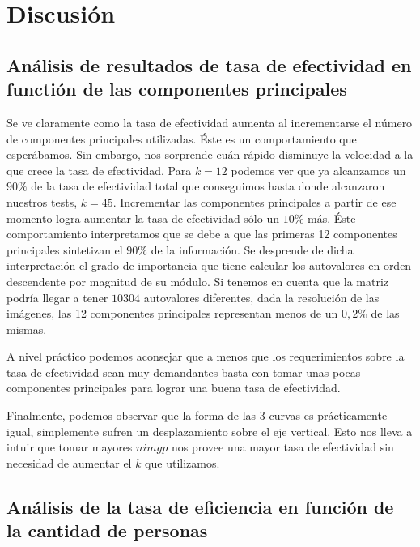 \section{Discusión}

\subsection{Análisis de resultados de tasa de efectividad en functión de las componentes principales}
Se ve claramente como la tasa de efectividad aumenta al incrementarse el número de componentes principales utilizadas. Éste es un comportamiento
que esperábamos. Sin embargo, nos sorprende cuán rápido disminuye la velocidad a la que crece la tasa de efectividad. Para $k = 12$ podemos ver
que ya alcanzamos un $90\%$ de la tasa de efectividad total que conseguimos hasta donde alcanzaron nuestros tests, $k = 45$. Incrementar las 
componentes principales a partir de ese momento logra aumentar la tasa de efectividad sólo un $10\%$ más. Éste comportamiento interpretamos
que se debe a que las primeras 12 componentes principales sintetizan el $90\%$ de la información. Se desprende de dicha interpretación
el grado de importancia que tiene calcular los autovalores en orden descendente por magnitud de su módulo. Si tenemos en cuenta que la matriz
podría llegar a tener $10304$ autovalores diferentes, dada la resolución de las imágenes, las 12 componentes principales representan
menos de un $0,2\%$ de las mismas.
\par
A nivel práctico podemos aconsejar que a menos que los requerimientos sobre la tasa de efectividad sean muy demandantes basta con 
tomar unas pocas componentes principales para lograr una buena tasa de efectividad.
\par
Finalmente, podemos observar que la forma de las 3 curvas es prácticamente igual, simplemente sufren un desplazamiento sobre el eje
vertical. Esto nos lleva a intuir que tomar mayores $nimgp$ nos provee una mayor tasa de efectividad sin necesidad de aumentar el $k$ que
utilizamos.

\subsection{Análisis de la tasa de eficiencia en función de la cantidad de personas}

